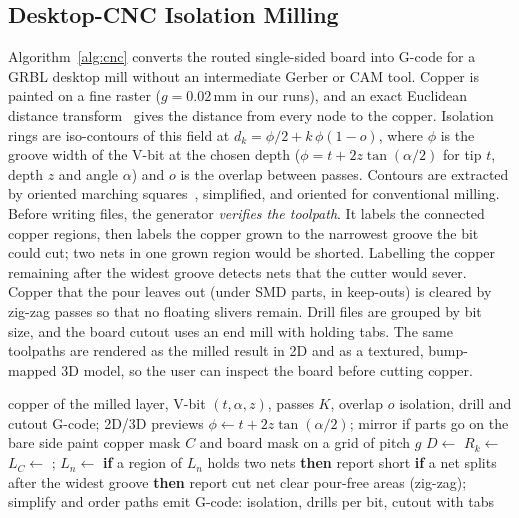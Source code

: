 \documentclass[journal]{IEEEtran}
\begin{document}
\subsection{Desktop-CNC Isolation Milling}
Algorithm~\ref{alg:cnc} converts the routed single-sided board into G-code for a GRBL desktop mill without an intermediate Gerber or CAM tool. Copper is painted on a fine raster ($g = 0.02$\,mm in our runs), and an exact Euclidean distance transform~\cite{felzenszwalb2012} gives the distance from every node to the copper. Isolation rings are iso-contours of this field at $d_k = \phi/2 + k\,\phi(1-o)$, where $\phi$ is the groove width of the V-bit at the chosen depth ($\phi = t + 2z\tan(\alpha/2)$ for tip $t$, depth $z$ and angle $\alpha$) and $o$ is the overlap between passes. Contours are extracted by oriented marching squares~\cite{lorensen1987}, simplified, and oriented for conventional milling. Before writing files, the generator \emph{verifies the toolpath}. It labels the connected copper regions, then labels the copper grown to the narrowest groove the bit could cut; two nets in one grown region would be shorted. Labelling the copper remaining after the widest groove detects nets that the cutter would sever. Copper that the pour leaves out (under SMD parts, in keep-outs) is cleared by zig-zag passes so that no floating slivers remain. Drill files are grouped by bit size, and the board cutout uses an end mill with holding tabs. The same toolpaths are rendered as the milled result in 2D and as a textured, bump-mapped 3D model, so the user can inspect the board before cutting copper.

\begin{algorithm}[t]
\caption{Verified isolation toolpaths}
\label{alg:cnc}
\small
\begin{algorithmic}[1]
\Require copper of the milled layer, V-bit $(t,\alpha,z)$, passes $K$, overlap $o$
\Ensure isolation, drill and cutout G-code; 2D/3D previews
\State $\phi \gets t + 2z\tan(\alpha/2)$; mirror if parts go on the bare side
\State paint copper mask $C$ and board mask on a grid of pitch $g$
\State $D \gets$  
 $R_k \gets$  \EndFor
\State $L_C \gets$ ; $L_n \gets$ 
\State \textbf{if} a region of $L_n$ holds two nets \textbf{then} report short
\State \textbf{if} a net splits after the widest groove \textbf{then} report cut net
\State clear pour-free areas (zig-zag); simplify and order paths
\State emit G-code: isolation, drills per bit, cutout with tabs
\end{algorithmic}
\end{algorithm}
\end{document}

